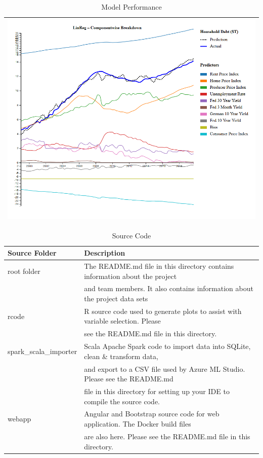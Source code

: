 \documentclass[sigconf,nonacm,11pt]{acmart}
\begin{document}
\begin{appendix}
\begin{table}[ht]
\caption{Model Performance}
\centering
\begin{tabular}{p{1.0\linewidth}}
\hline
\includegraphics[scale = 0.46]{linreg.png}\\
\hline
\end{tabular}
\end{table}

\end{appendix}


\begin{table}[ht]
\caption{Source Code}
\centering
\begin{tabular}{p{0.3\linewidth}p{0.7\linewidth}}
\hline
Source Folder & Description \\
\hline
root folder & The README.md file in this directory contains information about the project\\
            & and team members. It also contains information about the project data sets\\
\hline
rcode & R source code used to generate plots to assist with variable selection. Please \\
      & see the README.md file in this directory.\\
\hline
spark\_scala\_importer & Scala Apache Spark code to import data into SQLite, clean \& transform data,\\
                       & and export to a CSV file used by Azure ML Studio. Please see the README.md\\
                       & file in this directory for setting up your IDE to compile the source code.\\
\hline
webapp                 & Angular and Bootstrap source code for web application. The Docker build files\\
                       & are also here.  Please see the README.md file in this directory.\\
\hline
\end{tabular}
\end{table}
\end{document}
